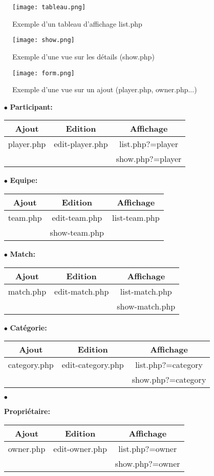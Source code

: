 \documentclass{article}
\begin{document}
\begin{figure}[h!]
\centering
\texttt{[image: tableau.png]}
\caption{Exemple d'un tableau d'affichage list.php}
\end{figure}

\begin{figure}[h!]
\centering
\texttt{[image: show.png]}
\caption{Exemple d'une vue sur les détails (show.php)}
\end{figure}

\begin{figure}[h!]
\centering
\texttt{[image: form.png]}
\caption{Exemple d'une vue sur un ajout (player.php, owner.php...)}
\end{figure}

\begin{itemize}
\item[$\bullet$]{\textbf{Participant: }}
\begin{tabular}{ccc}
 Ajout & Edition & Affichage \\
 \hline
player.php & edit-player.php & list.php?=player\\
  &  & show.php?=player
\end{tabular}

\item[$\bullet$]{\textbf{Equipe: }}
\begin{tabular}{ccc}
 Ajout & Edition & Affichage \\
 \hline
team.php & edit-team.php & list-team.php\\
  & show-team.php
\end{tabular}

\item[$\bullet$]{\textbf{Match: }}
\begin{tabular}{ccc}
 Ajout & Edition & Affichage \\
 \hline
match.php & edit-match.php & list-match.php\\
  & & show-match.php
\end{tabular}

\item[$\bullet$]{\textbf{Catégorie: }}
\begin{tabular}{ccc}
 Ajout & Edition & Affichage \\
 \hline
category.php & edit-category.php & list.php?=category\\
  &  & show.php?=category
\end{tabular}

\item[$\bullet$]{\textbf{Propriétaire: }
\begin{tabular}{ccc}
 Ajout & Edition & Affichage \\
 \hline
owner.php & edit-owner.php & list.php?=owner\\
  &  & show.php?=owner
\end{tabular}

}
\end{itemize}
\end{document}
